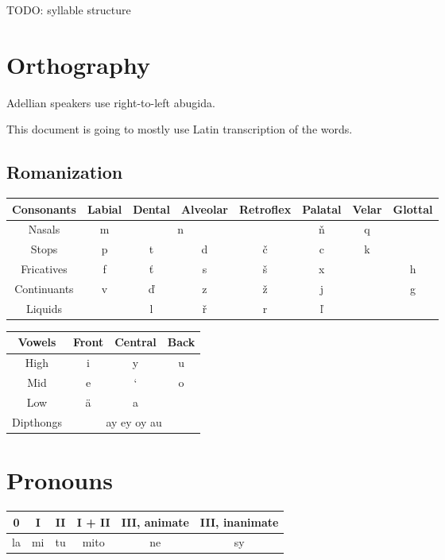 \documentclass[12pt]{article}
\begin{document}
	TODO: syllable structure

	\section{Orthography}
	
	Adellian speakers use right-to-left abugida.

	This document is going to mostly use Latin transcription of the words.
	
	\subsection{Romanization} 

	\begin{tabular}{||c | c c c c c c c||}
		\hline
		Consonants & Labial & Dental & Alveolar &
		Retroflex & Palatal & Velar & Glottal \\
		\hline
		Nasals & m & \multicolumn{2}{c}{n} & & ň & q & \\
		Stops & p & t & d & č & c & k & \\
		Fricatives & f & ť & s & š & x & & h \\
		Continuants & v & ď & z & ž & j & & g \\	
		Liquids & & l & ř & r & ľ & & \\
		\hline
	\end{tabular}

	\begin{tabular}{|| c | c c c || }
		\hline
	Vowels & Front & Central & Back \\
	\hline
	High & i & y & u \\
	Mid & e & ` & o \\
	Low & ä & a & \\
	Dipthongs & \multicolumn{3}{c||}{ay ey oy au} \\
	\hline
	\end{tabular}

	\section{Pronouns}

	\begin{tabular}{|| c | c | c | c | c | c ||}
		\hline
		0 & I & II & I + II & III, animate & III, inanimate\\
		\hline
		la & mi & tu & mito & ne & sy\\
		\hline
	\end{tabular}
\end{document}
